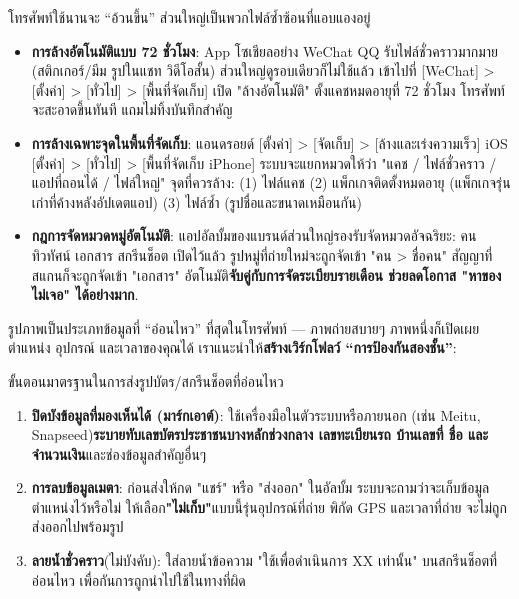 
โทรศัพท์ใช้นานจะ “อ้วนขึ้น” ส่วนใหญ่เป็นพวกไฟล์ซ้ำซ้อนที่แอบแองอยู่

\begin{itemize}
  \item \textbf{การล้างอัตโนมัติแบบ 72 ชั่วโมง}: App โซเชียลอย่าง WeChat QQ รับไฟล์ชั่วคราวมากมาย (สติกเกอร์/มีม รูปในแชท วิดีโอสั้น) ส่วนใหญ่ดูรอบเดียวก็ไม่ใช้แล้ว เข้าไปที่ [WeChat] > [ตั้งค่า] > [ทั่วไป] > [พื้นที่จัดเก็บ] เปิด "ล้างอัตโนมัติ" ตั้งแคชหมดอายุที่ 72 ชั่วโมง โทรศัพท์จะสะอาดขึ้นทันที แถมไม่ทิ้งบันทึกสำคัญ
  \item \textbf{การล้างเฉพาะจุดในพื้นที่จัดเก็บ}: แอนดรอยด์ [ตั้งค่า] > [จัดเก็บ] > [ล้างและเร่งความเร็ว] iOS [ตั้งค่า] > [ทั่วไป] > [พื้นที่จัดเก็บ iPhone] ระบบจะแยกหมวดให้ว่า "แคช / ไฟล์ชั่วคราว / แอปที่ถอนได้ / ไฟล์ใหญ่" จุดที่ควรล้าง: (1) ไฟล์แคช (2) แพ็กเกจติดตั้งหมดอายุ (แพ็กเกจรุ่นเก่าที่ค้างหลังอัปเดตแอป) (3) ไฟล์ซ้ำ (รูปชื่อและขนาดเหมือนกัน)
  \item \textbf{กฎการจัดหมวดหมู่อัตโนมัติ}: แอปอัลบั้มของแบรนด์ส่วนใหญ่รองรับจัดหมวดอัจฉริยะ: คน ทิวทัศน์ เอกสาร สกรีนช็อต เปิดไว้แล้ว รูปหมู่ที่ถ่ายใหม่จะถูกจัดเข้า "คน > ชื่อคน" สัญญาที่สแกนก็จะถูกจัดเข้า "เอกสาร" อัตโนมัติ\textbf{จับคู่กับการจัดระเบียบรายเดือน ช่วยลดโอกาส "หาของไม่เจอ" ได้อย่างมาก}.
\end{itemize}


รูปภาพเป็นประเภทข้อมูลที่ “อ่อนไหว” ที่สุดในโทรศัพท์ — ภาพถ่ายสบายๆ ภาพหนึ่งก็เปิดเผยตำแหน่ง อุปกรณ์ และเวลาของคุณได้ เราแนะนำให้\textbf{สร้างเวิร์กโฟลว์ “การป้องกันสองชั้น”}:

\begin{tcbwarn}{ขั้นตอนมาตรฐานในการส่งรูปบัตร/สกรีนช็อตที่อ่อนไหว}
\begin{enumerate}
  \item \textbf{ปิดบังข้อมูลที่มองเห็นได้ (มาร์กเอาต์)}: ใช้เครื่องมือในตัวระบบหรือภายนอก (เช่น Meitu, Snapseed)\textbf{ระบายทับเลขบัตรประชาชนบางหลักช่วงกลาง เลขทะเบียนรถ บ้านเลขที่ ชื่อ และจำนวนเงิน}และช่องข้อมูลสำคัญอื่นๆ
  \item \textbf{การลบข้อมูลเมตา}: ก่อนส่งให้กด "แชร์" หรือ "ส่งออก" ในอัลบั้ม ระบบจะถามว่าจะเก็บข้อมูลตำแหน่งไว้หรือไม่ ให้เลือก\textbf{"ไม่เก็บ"}แบบนี้รุ่นอุปกรณ์ที่ถ่าย พิกัด GPS และเวลาที่ถ่าย จะไม่ถูกส่งออกไปพร้อมรูป
  \item \textbf{ลายน้ำชั่วคราว}(ไม่บังคับ): ใส่ลายน้ำข้อความ "ใช้เพื่อดำเนินการ XX เท่านั้น" บนสกรีนช็อตที่อ่อนไหว เพื่อกันการถูกนำไปใช้ในทางที่ผิด
\end{enumerate}

\end{tcbwarn}

